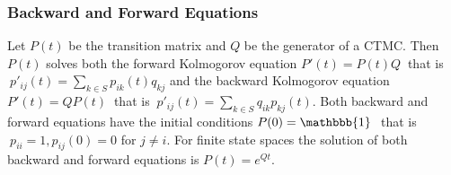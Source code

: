\subsubsection*{Backward and Forward Equations}
 Let $P(t)$ be the transition matrix and $Q$ be the generator of a CTMC. Then $P(t)$ solves both the forward Kolmogorov equation
$P'(t) = P(t)Q\ $ that is $\ p'_{ij}(t) = \sum_{k \in S} p_{ik}(t) q_{kj}$ and the backward Kolmogorov equation
$P'(t) = QP(t)\ $ that is $\ p'_{ij}(t) = \sum_{k \in S} q_{ik}p_{kj}(t).$
Both backward and forward equations have the initial conditions 
$P(0) = \mathbbb{1}\ $ that is $\ p_{ii} = 1, p_{ij}(0) = 0$ for $j \ne i$.
 For finite state spaces the solution of both backward and forward equations is $P(t) = e^{Qt}.$